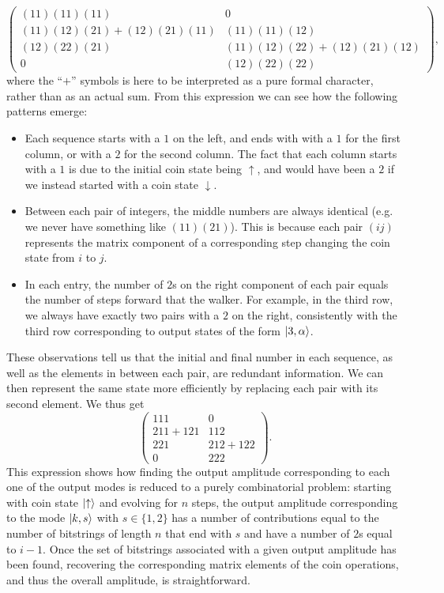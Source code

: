 \begin{example}[label={ex:qw_bimatrix_notation}]
    \begin{equation}
        \begin{pmatrix}
            (11)(11)(11) & 0 \\
            (11)(12)(21) + (12)(21)(11) & (11)(11)(12) \\
            (12)(22)(21) & (11)(12)(22) + (12)(21)(12) \\
            0 & (12)(22)(22)
        \end{pmatrix},
    \end{equation}
    where the ``$+$'' symbols is here to be interpreted as a pure formal character, rather than as an actual sum. From this expression we can see how the following patterns emerge:
    \begin{itemize}
        \item Each sequence starts with a $1$ on the left, and ends with with a $1$ for the first column, or with a $2$ for the second column. The fact that each column starts with a $1$ is due to the initial coin state being $\uparrow$, and would have been a $2$ if we instead started with a coin state $\downarrow$.
        \item Between each pair of integers, the middle numbers are always identical (e.g. we never have something like $(11)(21)$). This is because each pair $(ij)$ represents the matrix component of a corresponding step changing the coin state from $i$ to $j$.
        \item In each entry, the number of $2$s on the right component of each pair equals the number of steps forward that the walker. For example, in the third row, we always have exactly two pairs with a $2$ on the right, consistently with the third row corresponding to output states of the form $\ket{3,\alpha}$.
    \end{itemize}
    These observations tell us that the initial and final number in each sequence, as well as the elements in between each pair, are redundant information. We can then represent the same state more efficiently by replacing each pair with its second element. We thus get
    \begin{equation}
        \begin{pmatrix}
            111 & 0 \\
            211 + 121 & 112 \\
            221 & 212 + 122 \\
            0 & 222
        \end{pmatrix}.
    \end{equation}
    This expression shows how finding the output amplitude corresponding to each one of the output modes is reduced to a purely combinatorial problem: starting with coin state $\ket\uparrow$ and evolving for $n$ steps, the output amplitude corresponding to the mode $\ket{k,s}$ with $s\in\{1,2\}$ has a number of contributions equal to the number of bitstrings of length $n$ that end with $s$ and have a number of $2$s equal to $i-1$.
    Once the set of bitstrings associated with a given output amplitude has been found, recovering the corresponding matrix elements of the coin operations, and thus the overall amplitude, is straightforward.


\end{example}
